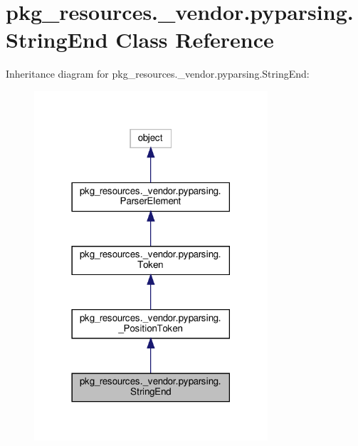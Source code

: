 \hypertarget{classpkg__resources_1_1__vendor_1_1pyparsing_1_1StringEnd}{}\section{pkg\+\_\+resources.\+\_\+vendor.\+pyparsing.\+String\+End Class Reference}
\label{classpkg__resources_1_1__vendor_1_1pyparsing_1_1StringEnd}


Inheritance diagram for pkg\+\_\+resources.\+\_\+vendor.\+pyparsing.\+String\+End\+:
\nopagebreak
\begin{figure}[H]
\begin{center}
\leavevmode
\includegraphics[width=246pt]{classpkg__resources_1_1__vendor_1_1pyparsing_1_1StringEnd__inherit__graph}
\end{center}
\end{figure}


